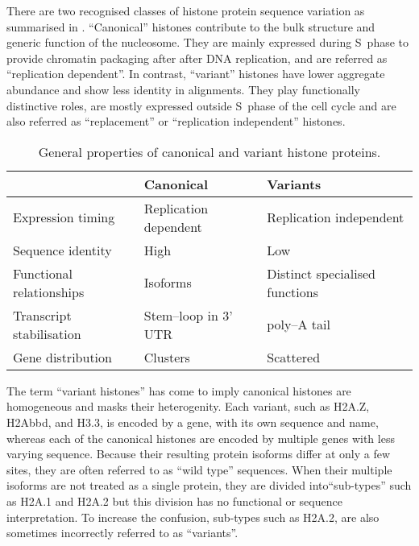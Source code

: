   There are two recognised classes of histone protein sequence variation as summarised
  in . ``Canonical'' histones contribute to the
  bulk structure and generic function of the nucleosome. They are mainly expressed
  during S~phase to provide chromatin packaging after after DNA replication,
  and are referred as ``replication dependent''. In contrast, ``variant'' histones
  have lower aggregate abundance and show less identity in alignments. They play
  functionally distinctive roles, are mostly expressed outside S~phase of the cell
  cycle and are also referred as ``replacement'' or ``replication independent'' histones.

  \begin{table*}
    \caption{General properties of canonical and variant histone proteins.}
    \label{tab:typical-histone-differences}
    \centering
    \begin{tabular}{l l l}
      \toprule
      \null                     & Canonical             & Variants \\
      \midrule
      Expression timing         & Replication dependent & Replication independent \\
      Sequence identity         & High                  & Low \\
      Functional relationships  & Isoforms              & Distinct specialised functions \\
      Transcript stabilisation  & Stem--loop in 3' UTR  & poly--A tail \\
      Gene distribution         & Clusters              & Scattered \\
      \bottomrule
    \end{tabular}
  \end{table*}

  The term ``variant histones'' has come to imply canonical histones are homogeneous
  and masks their heterogenity. Each variant, such as H2A.Z, H2Abbd, and H3.3,
  is encoded by a gene, with its own sequence and name,
  whereas each of the canonical histones are encoded by multiple genes
  with less varying sequence.
  Because their resulting protein isoforms differ at only a few sites, they are often
  referred to as ``wild type'' sequences.
  When their multiple isoforms are not treated as a single protein, they are divided
  into``sub-types'' such as H2A.1 and H2A.2 but this division has no functional or sequence
  interpretation. To increase the confusion, sub-types such as H2A.2, are also sometimes incorrectly
  referred to as ``variants''\addref{}.

